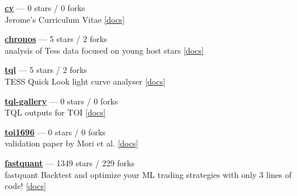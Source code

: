 \item \href{https://github.com/jpdeleon/cv}{{\bf cv}} --- 0 stars / 0 forks \\
Jerome's Curriculum Vitae \href{https://raw.githubusercontent.com/jpdeleon/cv/main-pdf/tex/cv_pubs.pdf}{[docs]}

\item \href{https://github.com/jpdeleon/chronos}{{\bf chronos}} --- 5 stars / 2 forks \\
analysis of Tess data focused on young host stars \href{None}{[docs]}

\item \href{https://github.com/jpdeleon/tql}{{\bf tql}} --- 5 stars / 2 forks \\
TESS Quick Look light curve analyser \href{None}{[docs]}

\item \href{https://github.com/jpdeleon/tql-gallery}{{\bf tql-gallery}} --- 0 stars / 0 forks \\
TQL outputs for TOI \href{None}{[docs]}

\item \href{https://github.com/jpdeleon/toi1696}{{\bf toi1696}} --- 0 stars / 0 forks \\
validation paper by Mori et al. \href{None}{[docs]}

\item \href{https://github.com/enzoampil/fastquant}{{\bf fastquant}} --- 1349 stars / 229 forks \\
fastquant {\textemdash} Backtest and optimize your ML trading strategies with only 3 lines of code! \href{}{[docs]}